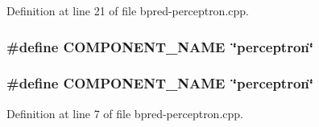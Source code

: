 Definition at line 21 of file bpred-perceptron.cpp.
\subsubsection[{COMPONENT\_\-NAME}]{\setlength{\rightskip}{0pt plus 5cm}\#define COMPONENT\_\-NAME~\char`\"{}perceptron\char`\"{}}\label{zesto-bpred_8cpp_9146ade7ce24e3db226a973a59063892}


\subsubsection[{COMPONENT\_\-NAME}]{\setlength{\rightskip}{0pt plus 5cm}\#define COMPONENT\_\-NAME~\char`\"{}perceptron\char`\"{}}\label{bpred-perceptron_8cpp_9146ade7ce24e3db226a973a59063892}




Definition at line 7 of file bpred-perceptron.cpp.